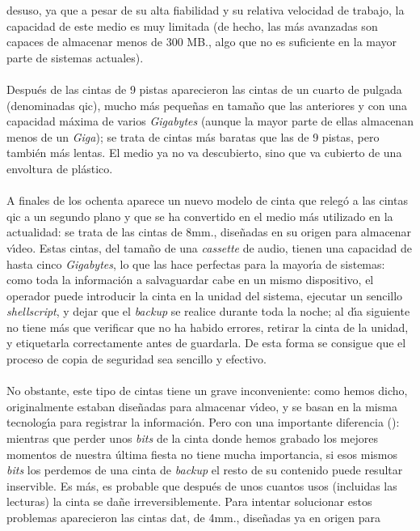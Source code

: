 desuso, ya que a pesar de su alta fiabilidad y su relativa velocidad de trabajo,
la capacidad de este medio es muy limitada (de hecho, las m\'as avanzadas son 
capaces de almacenar menos de 300 MB., algo que no es suficiente en la mayor
parte de sistemas actuales).\\
\\Despu\'es de las cintas de 9 pistas aparecieron las cintas de un cuarto de
pulgada (denominadas {\sc qic}), mucho m\'as peque\~nas en tama\~no que las
anteriores y con una capacidad m\'axima de varios {\it Gigabytes} (aunque la
mayor parte de ellas almacenan menos de un {\it Giga}); se trata de cintas
m\'as baratas que las de 9 pistas, pero tambi\'en m\'as lentas. El medio ya no
va descubierto, sino que va cubierto de una envoltura de pl\'astico.\\
\\A finales de los ochenta aparece un nuevo modelo de cinta que releg\'o a las
cintas {\sc qic} a un segundo plano y que se ha convertido en el medio m\'as
utilizado en la actualidad: se trata de las cintas de 8mm., dise\~nadas en su
origen para almacenar v\'{\i}deo. Estas cintas, del tama\~no de una {\it 
cassette} de audio, tienen una capacidad de hasta cinco {\it Gigabytes}, lo que
las hace perfectas para la mayor\'{\i}a de sistemas: como toda la informaci\'on
a salvaguardar cabe en un mismo dispositivo, el operador puede introducir la
cinta en la unidad del sistema, ejecutar un sencillo {\it shellscript}, y dejar
que el {\it backup} se realice durante toda la noche; al d\'{\i}a siguiente no
tiene m\'as que verificar que no ha habido errores, retirar la cinta de la 
unidad, y etiquetarla correctamente antes de guardarla. De esta forma se
consigue que el proceso de copia de seguridad sea sencillo y efectivo.\\
\\No obstante, este tipo de cintas tiene un grave inconveniente: como hemos 
dicho, originalmente estaban dise\~nadas para almacenar v\'{\i}deo, y se basan
en la misma tecnolog\'{\i}a para registrar la informaci\'on. Pero con una 
importante diferencia (\cite{kn:pep94}): mientras que perder unos {\it bits} de
la cinta donde hemos grabado los mejores momentos de nuestra \'ultima fiesta no 
tiene mucha importancia, si esos mismos {\it bits} los perdemos de una cinta de
{\it backup} el resto de su contenido puede resultar inservible. Es m\'as, es
probable que despu\'es de unos cuantos usos (incluidas las lecturas) la cinta
se da\~ne irreversiblemente. Para intentar solucionar estos problemas 
aparecieron las cintas {\sc dat}, de 4mm., dise\~nadas ya en origen para 
